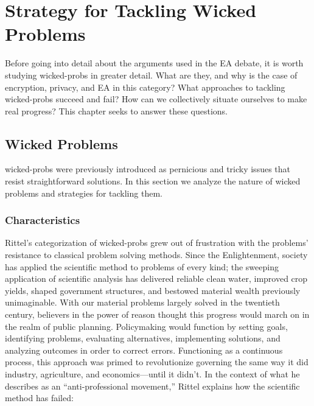 \chapter{Strategy for Tackling Wicked Problems}
\label{chap-policy}

Before going into detail about the arguments used in the \ac{EA} debate, it is worth studying \acp{wicked-prob} in
greater detail. What are they, and why is the case of encryption, privacy, and \ac{EA} in this category? What approaches
to tackling \acp{wicked-prob} succeed and fail? How can we collectively situate ourselves to make real progress? This
chapter seeks to answer these questions.


\section{Wicked Problems}

\Acp{wicked-prob} were previously introduced as pernicious and tricky issues that resist straightforward solutions.
In this section we analyze the nature of wicked problems and strategies for tackling them.

\subsection{Characteristics}
\label{wicked-characteristics}

Rittel's categorization of \acp{wicked-prob} grew out of frustration with the problems' resistance to classical problem
solving methods. Since the Enlightenment, society has applied the scientific method to problems of every kind; the
sweeping application of scientific analysis has delivered reliable clean water, improved crop yields, shaped government
structures, and bestowed material wealth previously unimaginable. With our material problems largely solved in the
twentieth century, believers in the power of reason thought this progress would march on in the realm of public
planning. Policymaking would function by setting goals, identifying problems, evaluating alternatives, implementing
solutions, and analyzing outcomes in order to correct errors. Functioning as a continuous process, this approach was
primed to revolutionize governing the same way it did industry, agriculture, and economics---until it didn't. In the
context of what he describes as an ``anti-professional movement,'' Rittel explains how the scientific method has failed:

